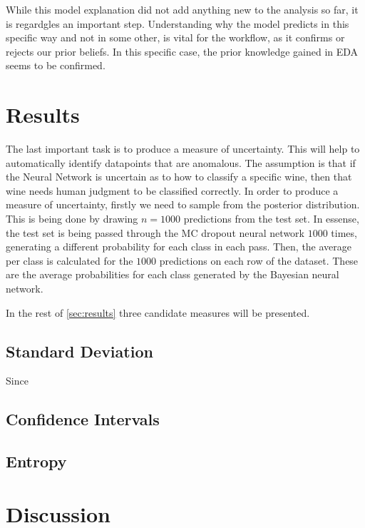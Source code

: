 \documentclass[11pt,twoside]{article}
\numberwithin{Theorem}{section}
\numberwithin{Definition}{section}
\numberwithin{Lemma}{section}
\numberwithin{Algorithm}{section}
\numberwithin{equation}{section}
\begin{document}
While this model explanation did not add anything new to the analysis so far, it is regardgles an important step. Understanding why the model predicts in this specific way and not in some other, is vital for the workflow, as it confirms or rejects our prior beliefs. In this specific case, the prior knowledge gained in EDA seems to be confirmed. 

\section{Results}
\label{sec:results}

The last important task is to produce a measure of uncertainty. This will help to automatically identify datapoints that are anomalous. The assumption is that if the Neural Network is uncertain as to how to classify a specific wine, then that wine needs human judgment to be classified correctly.
In order to produce a measure of uncertainty, firstly we need to sample from the posterior distribution. This is being done by drawing $n=1000$ predictions from the test set. In essense, the test set is being passed through the MC dropout neural network $1000$ times, generating a different probability for each class in each pass. Then, the average per class is calculated for the $1000$ predictions on each row of the dataset. These are the average probabilities for each class generated by the Bayesian neural network. 

In the rest of \autoref{sec:results} three candidate measures will be presented.

\subsection{Standard Deviation}
Since 

\subsection{Confidence Intervals}
\blindtext

\subsection{Entropy}
\blindtext
\cleardoublepage

\section{Discussion}
\blindtext
\clearpage
\end{document}
